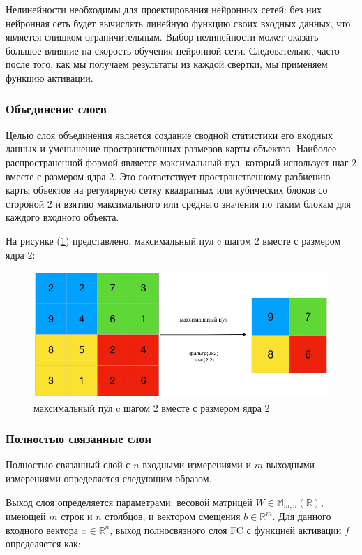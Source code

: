 Нелинейности необходимы для проектирования нейронных сетей: без них нейронная сеть будет вычислять линейную функцию своих входных данных, что является слишком ограничительным. Выбор нелинейности может оказать большое влияние на скорость обучения нейронной сети. Следовательно, часто после того, как мы получаем результаты из каждой свертки, мы применяем функцию активации.

\subsubsection*{Объединение слоев}

Целью слоя объединения является создание сводной статистики его входных данных и уменьшение пространственных размеров карты объектов. Наиболее распространенной формой является максимальный пул, который использует шаг 2 вместе с размером ядра 2. Это соответствует пространственному разбиению карты объектов на регулярную сетку квадратных или кубических блоков со стороной 2 и взятию максимального или среднего значения по таким блокам для каждого входного объекта.

На рисунке (\ref{fig:max-pool}) представлено, максимальный пул c шагом 2 вместе с размером ядра 2: 
\begin{figure}[H]
	\centering
	\includegraphics[width=0.5\linewidth]{images/max-pooling.png}
	\caption{максимальный пул c шагом 2 вместе с размером ядра 2}
	\label{fig:max-pool}
\end{figure}

\subsubsection*{Полностью связанные слои}

Полностью связанный слой с \(n\) входными измерениями и \(m\) выходными измерениями определяется следующим образом.

Выход слоя определяется параметрами: весовой матрицей \(W \in \mathbb{M}_{m,n}(\mathbb{R})\), имеющей \(m\) строк и \(n\) столбцов, и вектором смещения \(b \in \mathbb{R}^{m}\). Для данного входного вектора \(x \in \mathbb{R}^{n}\), выход полносвязного слоя FC с функцией активации \(f\) определяется как:


